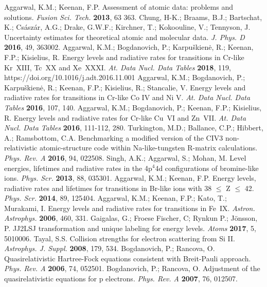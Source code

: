 \documentclass[fleqn]{article}
\begin{document}
\begin{thebibliography}{999}

 Aggarwal, K.M.;  Keenan, F.P.  Assessment of atomic data: problems and solutions.  {\em Fusion Sci. Tech.}  {\bf 2013}, 63  363.
  Chung, H-K.; Braams, B.J.; Bartschat, K.; Cs{\'a}sz{\'a}r, A.G.;  Drake, G.W.F.; Kirchner, T.; Kokoouline, V.;  Tennyson, J. Uncertainty estimates for theoretical atomic 
and molecular data. {\em J. Phys. D} {\bf 2016}, 49, 363002.
 Aggarwal, K.M.;  Bogdanovich, P.; Karpu\v{s}kien\.e, R.; Keenan, F.P.; Kisielius, R. Energy levels and radiative rates for transitions in Cr-like Kr~XIII, Tc~XX and Xe~XXXI.  {\em At. Data Nucl. Data Tables}  {\bf 2018}, 119,  https://doi.org/10.1016/j.adt.2016.11.001
 Aggarwal, K.M.;  Bogdanovich, P.; Karpu\v{s}kien\.e, R.; Keenan, F.P.; Kisielius, R.;  Stancalie, V. Energy levels and radiative rates for transitions in Cr-like Co IV and Ni V.  {\em At. Data Nucl. Data Tables}  {\bf 2016}, 107, 140. 
 Aggarwal, K.M.;  Bogdanovich, P.;  Keenan, F.P.; Kisielius, R. Energy levels and radiative rates for  Cr-like Cu~VI and Zn~VII.  {\em At. Data Nucl. Data Tables}  {\bf 2016}, 111-112,  280. 
 Turkington, M.D.; Ballance, C.P.; Hibbert, A.; Ramsbottom, C.A. Benchmarking a modified version of the CIV3 non-relativistic atomic-structure code within Na-like-tungsten R-matrix calculations.  {\em Phys. Rev. A} {\bf 2016}, 94, 022508.
 Singh,  A.K.; Aggarwal, S.; Mohan, M.  Level energies, lifetimes and radiative rates in the 4p$^4$4d configurations of bromine-like ions.  {\em Phys. Scr.} {\bf 2013}, 88, 035301.
  Aggarwal,  K.M.; Keenan, F.P. Energy levels, radiative rates and lifetimes for transitions in Br-like ions with 38 $\le$ Z $\le$ 42. {\em Phys. Scr.} {\bf 2014}, 89, 125404.
   Aggarwal, K.M.;  Keenan, F.P.; Kato, T.; Murakami, I. Energy levels and radiative rates for transitions in Fe~IX. {\em Astron. Astrophys.}  {\bf 2006},  460,  331.
 Gaigalas, G.;  Froese Fischer, C;  Rynkun P.;  J\"{o}nsson, P.     JJ2LSJ transformation and unique labeling for energy levels.  {\em Atoms} {\bf 2017}, 5, 5010006.
 Tayal, S.S. Collision strengths for electron scattering from Si II.   {\em Astrophys. J. Suppl.} {\bf 2008}, 179, 534.
 Bogdanovich, P.; Rancova, O.  Quasirelativistic Hartree-Fock equations consistent with Breit-Pauli approach.  {\em Phys. Rev. A} {\bf 2006}, 74, 052501.
 Bogdanovich, P.; Rancova, O. Adjustment of the quasirelativistic equations for p electrons.   {\em Phys. Rev.  A} {\bf 2007}, 76, 012507.

\end{thebibliography}
\end{document}
